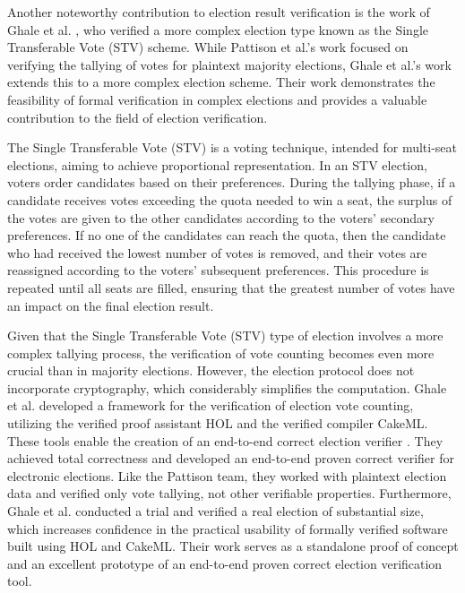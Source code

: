 Another noteworthy contribution to election result verification is the work of Ghale et al. \cite{Ghale2018VerifiedCC}, who verified a more complex election type known as the Single Transferable Vote (STV) scheme. While Pattison et al.'s work focused on verifying the tallying of votes for plaintext majority elections, Ghale et al.'s work extends this to a more complex election scheme. Their work demonstrates the feasibility of formal verification in complex elections and provides a valuable contribution to the field of election verification.

The Single Transferable Vote (STV) is a voting technique, intended for multi-seat elections, aiming to achieve proportional representation. In an STV election, voters order candidates based on their preferences. During the tallying phase, if a candidate receives votes exceeding the quota needed to win a seat, the surplus of the votes are given to the other candidates according to the voters' secondary preferences. If no one of the candidates can reach the quota, then the candidate who had received the lowest number of votes is removed, and their votes are reassigned according to the voters' subsequent preferences. This procedure is repeated until all seats are filled, ensuring that the greatest number of votes have an impact on the final election result.

Given that the Single Transferable Vote (STV) type of election involves a more complex tallying process, the verification of vote counting becomes even more crucial than in majority elections. However, the election protocol does not incorporate cryptography, which considerably simplifies the computation. Ghale et al. \cite{Ghale2018VerifiedCC} developed a framework for the verification of election vote counting, utilizing the verified proof assistant HOL and the verified compiler CakeML. These tools enable the creation of an end-to-end correct election verifier \cite{Kumar2014HOLWD, Tan2019TheVC}. They achieved total correctness and developed an end-to-end proven correct verifier for electronic elections. Like the Pattison team, they worked with plaintext election data and verified only vote tallying, not other verifiable properties. Furthermore, Ghale et al.\cite{Ghale2018VerifiedCC}  conducted a trial and verified a real election of substantial size, which increases confidence in the practical usability of formally verified software built using HOL and CakeML. Their work serves as a standalone proof of concept and an excellent prototype of an end-to-end proven correct election verification tool.

